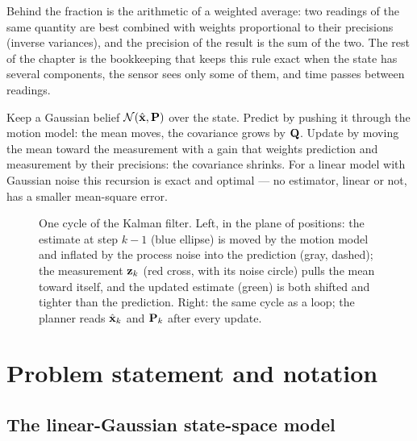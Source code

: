 Behind the fraction is the arithmetic of a weighted average: two readings of
the same quantity are best combined with weights proportional to their
precisions (inverse variances), and the precision of the result is the sum of
the two. The rest of the chapter is the bookkeeping that keeps this rule exact
when the state has several components, the sensor sees only some of them, and
time passes between readings.

\begin{keyidea}
Keep a Gaussian belief $\mathcal{N}(\hat{\mathbf{x}},\mathbf{P})$ over the state. Predict
by pushing it through the motion model: the mean moves, the covariance grows
by $\mathbf{Q}$. Update by moving the mean toward the measurement with a gain
that weights prediction and measurement by their precisions: the covariance
shrinks. For a linear model with Gaussian noise this recursion is exact and
optimal --- no estimator, linear or not, has a smaller mean-square error.
\end{keyidea}

\begin{figure}[tb]
  \centering
  \caption{One cycle of the Kalman filter. Left, in the plane of positions:
  the estimate at step $k-1$ (blue ellipse) is moved by the motion model and
  inflated by the process noise into the prediction (gray, dashed); the
  measurement $\mathbf{z}_k$ (red cross, with its noise circle) pulls the mean
  toward itself, and the updated estimate (green) is both shifted and
  tighter than the prediction. Right: the same cycle as a loop; the planner
  reads $\hat{\mathbf{x}}_k$ and $\mathbf{P}_k$ after every update.}
  \label{fig:ch18-idea}
\end{figure}

\section{Problem statement and notation}
\label{sec:ch18-problem}

\subsection{The linear-Gaussian state-space model}

